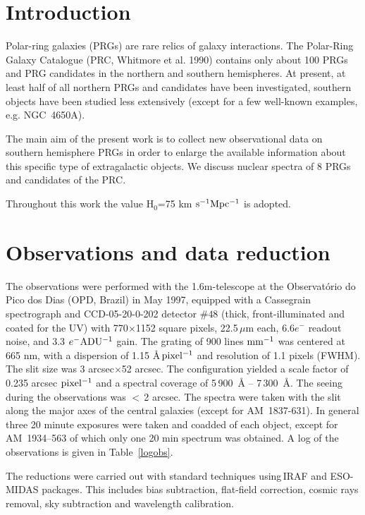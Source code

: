 \section{Introduction}

Polar-ring  galaxies  (PRGs) are rare  relics of galaxy  interactions.  The
Polar-Ring  Galaxy  Catalogue  (PRC,  Whitmore et al.  1990)  contains only
about 100 PRGs and PRG candidates in the northern and southern hemispheres.
At present, at least half of all  northern  PRGs and  candidates  have been
investigated,  southern objects have been studied less extensively  (except
for a few well-known examples, e.g.  NGC~4650A).

The main aim of the present  work is to collect new  observational  data on
southern  hemisphere  PRGs in order to enlarge  the  available  information
about this  specific  type of  extragalactic  objects.  We discuss  nuclear
spectra of 8 PRGs and candidates of the PRC.

Throughout this work the value H$_0$=75 km $\rm s^{-1}Mpc^{-1}$ is adopted.

\section[]{Observations and data reduction}

The   observations   were  performed   with  the   1.6m-telescope   at  the
Observat\'orio  do Pico dos Dias (OPD, Brazil) in May 1997, equipped with a
Cassegrain   spectrograph  and  CCD-05-20-0-202   detector  $\#48$  (thick,
front-illuminated  and  coated  for the  UV)  with  770$\times$1152  square
pixels,  22.5\,$\mu$m  each,  6.6$e^-$  readout  noise,  and 3.3  $e^{-}\rm
ADU^{-1}$ gain.  The grating of 900 lines $\rm mm^{-1}$ was centered at 665
nm, with a dispersion of 1.15 \AA \,$\rm  pixel^{-1}$ and resolution of 1.1
pixels   (FWHM).  The  slit  size  was  3   arcsec$\times$52   arcsec.  The
configuration yielded a scale factor of 0.235 arcsec $\rm pixel^{-1}$ and a
spectral  coverage of 5\,900~{\AA} --  7\,300~{\AA}.  The seeing during the
observations was $<$\,2 arcsec.  The spectra were taken with the slit along
the  major  axes of the  central  galaxies  (except  for  AM~1837-631).  In
general  three 20 minute  exposures  were taken and coadded of each object,
except for  AM~1934--563 of which only one 20 min spectrum was obtained.  A
log of the observations is given in Table~\ref{logobs}.

The reductions were carried out with standard techniques  using\,{\sc IRAF}
and {\sc ESO-MIDAS}  packages.  This includes bias subtraction,  flat-field
correction,   cosmic  rays   removal,  sky   subtraction   and   wavelength
calibration.

